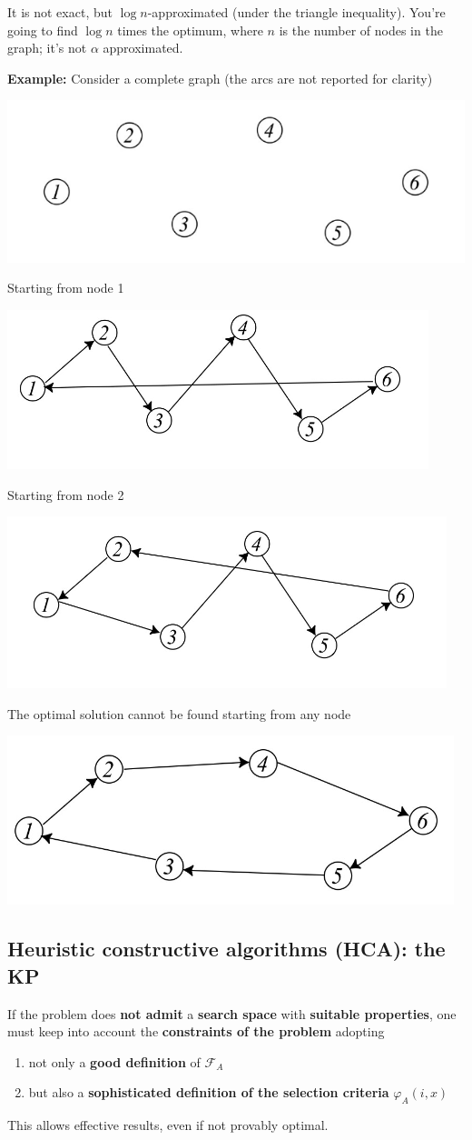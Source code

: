 It is not exact, but $\log n$-approximated (under the triangle inequality). You're going to find $\log n$ times the optimum, where $n$ is the number of nodes in the graph; it's not $\alpha$ approximated.\\

\newpage

\textbf{Example:} Consider a complete graph (the arcs are not reported for clarity)
\begin{center}
	\includegraphics[width=0.5\columnwidth]{img/NNTSP1}
\end{center}
Starting from node 1 
\begin{center}
	\includegraphics[width=0.5\columnwidth]{img/NNTSP2}
\end{center}
Starting from node 2
\begin{center}
	\includegraphics[width=0.5\columnwidth]{img/NNTSP3}
\end{center}
The optimal solution cannot be found starting from any node
\begin{center}
	\includegraphics[width=0.5\columnwidth]{img/NNTSP4}
\end{center}

\newpage

\subsection{Heuristic constructive algorithms (HCA): the KP}
If the problem does \textbf{not admit} a \textbf{search space} with \textbf{suitable properties}, one must keep into account the \textbf{constraints of the problem} adopting
\begin{enumerate}
	\item not only a \textbf{good definition} of $\mathcal{F}_A$
	\item but also a \textbf{sophisticated definition of the selection criteria} $\varphi_A (i, x)$
\end{enumerate}
This allows effective results, even if not provably optimal.\\

